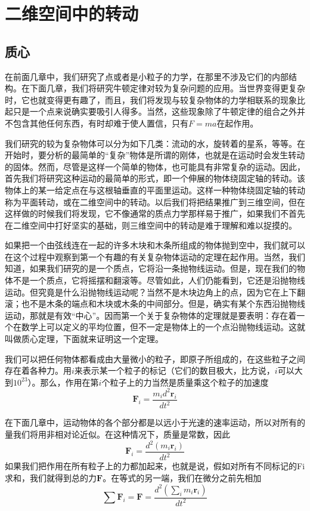 \chapter{二维空间中的转动}

\section{质心}

在前面几章中，我们研究了点或者是小粒子的力学，在那里不涉及它们的内部结构。在下面几章，我们将研究牛顿定律对较为复杂问题的应用。当世界变得更复杂时，它也就变得更有趣了，而且，我们将发现与较复杂物体的力学相联系的现象比起只是一个点来说确实要吸引人得多。当然，这些现象除了牛顿定律的组合之外并不包含其他任何东西，有时却难于使人置信，只有$F=ma$在起作用。

我们研究的较为复杂物体可以分为如下几类：流动的水，旋转着的星系，等等。在开始时，要分析的最简单的“复杂”物体是所谓的刚体，也就是在运动时会发生转动的固体。然而，尽管是这样一个简单的物体，也可能具有非常复杂的运动。因此，首先我们将研究这种运动的最简单的形式，即一个伸展的物体绕固定轴的转动。该物体上的某一给定点在与这根轴垂直的平面里运动。这样一种物体绕固定轴的转动称为平面转动，或在二维空间中的转动。以后我们将把结果推广到三维空间，但在这样做的时候我们将发现，它不像通常的质点力学那样易于推广，如果我们不首先在二维空间中打好坚实的基础，则三维空间中的转动是难于理解和难以捉摸的。

如果把一个由弦线连在一起的许多木块和木条所组成的物体抛到空中，我们就可以在这个过程中观察到第一个有趣的有关复杂物体运动的定理在起作用。当然，我们知道，如果我们研究的是一个质点，它将沿一条抛物线运动。但是，现在我们的物体不是一个质点，它将摇摆和翻滚等。尽管如此，人们仍能看到，它还是沿抛物线运动。但究竟是什么沿抛物线运动呢？当然不是木块边角上的点，因为它在上下翻滚；也不是木条的端点和木块或木条的中间部分。但是，确实有某个东西沿抛物线运动，那就是有效“中心”。因而第一个关于复杂物体的定理就是要表明：存在着一个在数学上可以定义的平均位置，但不一定是物体上的一个点沿抛物线运动。这就叫做质心定理，下面就来证明这一个定理。

我们可以把任何物体都看成由大量微小的粒子，即原子所组成的，在这些粒子之间存在着各种力。用$i$来表示某一个粒子的标记（它们的数目极大，比方说，$i$可以大到$10^{23}$）。那么，作用在第$i$个粒子上的力当然是质量乘这个粒子的加速度
\begin{equation}
    \label{Eq:I:18:1}
    \boldsymbol{F}_i = \frac{m_id^2\boldsymbol{r}_i}{dt^2}
\end{equation}

在下面几章中，运动物体的各个部分都是以远小于光速的速率运动，所以对所有的量我们将用非相对论近似。在这种情况下，质量是常数，因此
\begin{equation}
    \label{Eq:I:18:2}
    \boldsymbol{F}_i = \frac{d^2(m_i\boldsymbol{r}_i)}{dt^2}
\end{equation}
如果我们把作用在所有粒子上的力都加起来，也就是说，假如对所有不同标记的Fi求和，我们就得到总的力$\boldsymbol{F}$。在等式的另一端，我们在微分之前先相加
\begin{equation}
    \label{Eq:I:18:3}
    \sum \boldsymbol{F}_i = \boldsymbol{F} = \frac{d^2(\sum\limits_{i} m_i\boldsymbol{r}_i)}{dt^2}
\end{equation}

